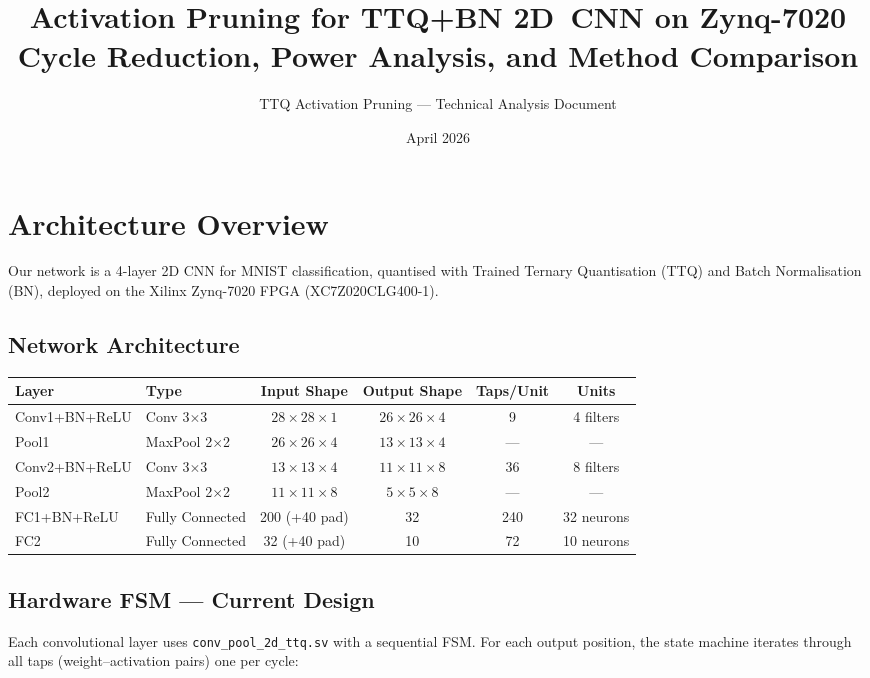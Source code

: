 \documentclass[11pt,a4paper]{article}
\title{\textbf{Activation Pruning for TTQ+BN 2D~CNN on Zynq-7020}\\[6pt]
\large Cycle Reduction, Power Analysis, and Method Comparison}
\author{TTQ Activation Pruning — Technical Analysis Document}
\date{April 2026}
\begin{document}
\maketitle
\tableofcontents
\newpage

\section{Architecture Overview}

Our network is a 4-layer 2D CNN for MNIST classification, quantised with
Trained Ternary Quantisation (TTQ) and Batch Normalisation (BN), deployed
on the Xilinx Zynq-7020 FPGA (XC7Z020CLG400-1).

\subsection{Network Architecture}

\begin{center}
\begin{tabular}{llcccc}
\toprule
\textbf{Layer} & \textbf{Type} & \textbf{Input Shape} & \textbf{Output Shape} & \textbf{Taps/Unit} & \textbf{Units} \\
\midrule
Conv1+BN+ReLU & Conv 3$\times$3 & $28\times28\times1$ & $26\times26\times4$ & 9 & 4 filters \\
Pool1          & MaxPool 2$\times$2 & $26\times26\times4$ & $13\times13\times4$ & — & — \\
Conv2+BN+ReLU & Conv 3$\times$3 & $13\times13\times4$ & $11\times11\times8$ & 36 & 8 filters \\
Pool2          & MaxPool 2$\times$2 & $11\times11\times8$ & $5\times5\times8$ & — & — \\
FC1+BN+ReLU   & Fully Connected & 200 (+40 pad) & 32 & 240 & 32 neurons \\
FC2            & Fully Connected & 32 (+40 pad)  & 10 & 72  & 10 neurons \\
\bottomrule
\end{tabular}
\end{center}

\subsection{Hardware FSM — Current Design}

Each convolutional layer uses \texttt{conv\_pool\_2d\_ttq.sv} with a
sequential FSM.  For each output position, the state machine iterates
through all taps (weight--activation pairs) one per cycle:
\end{document}
